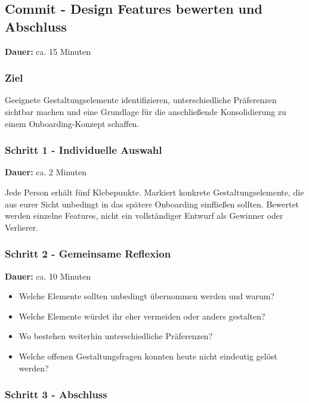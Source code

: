 \clearpage

\subsection{Commit - Design Features bewerten und Abschluss}
\label{subsec:workshop-commit}

\noindent
\textbf{Dauer:} ca. 15 Minuten

\subsubsection*{Ziel}

Geeignete Gestaltungselemente identifizieren, unterschiedliche
Präferenzen sichtbar machen und eine Grundlage für die anschließende
Konsolidierung zu einem Onboarding-Konzept schaffen.

\subsubsection*{Schritt 1 - Individuelle Auswahl}

\noindent
\textbf{Dauer:} ca. 2 Minuten

Jede Person erhält fünf Klebepunkte. Markiert konkrete Gestaltungselemente, die aus eurer Sicht unbedingt in das spätere Onboarding einfließen sollten. Bewertet werden einzelne Features, nicht ein vollständiger Entwurf als Gewinner oder Verlierer.

\subsubsection*{Schritt 2 - Gemeinsame Reflexion}

\noindent
\textbf{Dauer:} ca. 10 Minuten

\begin{itemize}
    \item Welche Elemente sollten unbedingt übernommen werden und warum?
    \item Welche Elemente würdet ihr eher vermeiden oder anders
    gestalten?
    \item Wo bestehen weiterhin unterschiedliche Präferenzen?
    \item Welche offenen Gestaltungsfragen konnten heute nicht eindeutig
    gelöst werden?
\end{itemize}

\subsubsection*{Schritt 3 - Abschluss}

